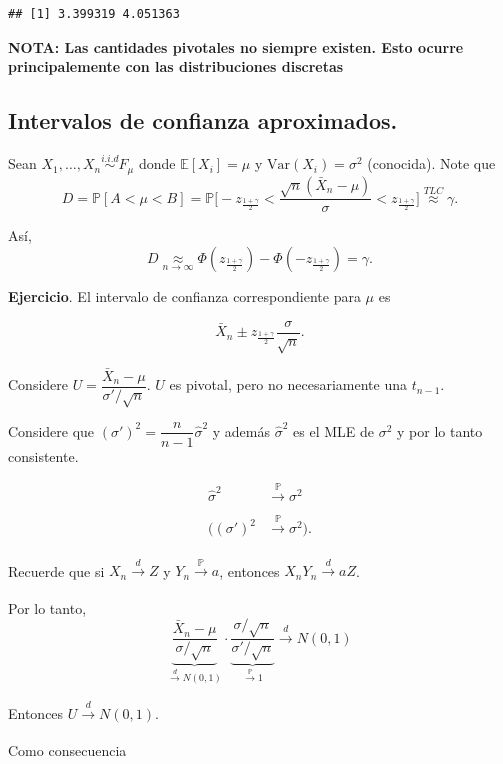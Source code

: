 \documentclass[
  12pt,
]{book}
\begin{document}
\begin{verbatim}
## [1] 3.399319 4.051363
\end{verbatim}

\textbf{NOTA: Las cantidades pivotales no siempre existen. Esto ocurre principalemente
con las distribuciones discretas}

\hypertarget{intervalos-de-confianza-aproximados.}{%
\subsection{Intervalos de confianza aproximados.}\label{intervalos-de-confianza-aproximados.}}

Sean \(X_1,\dots, X_n \stackrel{i.i.d}{\sim}F_{\mu}\) donde \(\mathbb{E}[X_i] = \mu\) y
\(\text{Var}(X_i) = \sigma^2\) (conocida). Note que \[D = \mathbb P[A<\mu<B] = \mathbb P
\bigg[-z_{\frac{1+\gamma}2}<\dfrac{\sqrt n(\bar X_n-\mu)}{\sigma} <z_{\frac{1+\gamma}2}\bigg]
\stackrel{TLC}{\approx} \gamma.\]

Así, \[D \underset{n\to\infty}{\approx}
\Phi\left(z_{\frac{1+\gamma}2}\right)-\Phi\left(-z_{\frac{1+\gamma}2}\right) = \gamma.\]

\textbf{Ejercicio}. El intervalo de confianza correspondiente para \(\mu\) es

\[
\bar
X_n \pm z_{\frac{1+\gamma}2}\dfrac{\sigma}{\sqrt n}.
\]

Considere \(U = \dfrac{\bar X_n - \mu}{\sigma'/\sqrt n}\). \(U\) es pivotal, pero no
necesariamente una \(t_{n-1}\).

Considere que \((\sigma')^2 = \dfrac{n}{n-1}\hat \sigma^2\) y además \(\hat\sigma^2\) es el MLE de
\(\sigma^2\) y por lo tanto consistente.

\begin{align*}
\hat{\sigma}^2 &\xrightarrow[]{\mathbb{P}}\sigma^2 \\
((\sigma')^2 &\xrightarrow[]{\mathbb{P}}\sigma^2).
\end{align*}

Recuerde que si \(X_n\xrightarrow[]{d}Z\) y \(Y_n\xrightarrow[]{\mathbb{P}}a\), entonces
\(X_nY_n \xrightarrow[]{d}aZ\).

Por lo tanto,
\[
\underbrace{\dfrac{\bar X_n-\mu}{\sigma/\sqrt n}}_{\xrightarrow[]{d}
N(0,1)} \cdot \underbrace{\dfrac{\sigma/\sqrt n}{\sigma'/\sqrt n}}_{\xrightarrow[]{\mathbb
P}1} \xrightarrow[]{d}N(0,1)\]

Entonces \(U\xrightarrow[]{d}N(0,1)\).

Como consecuencia
\end{document}
